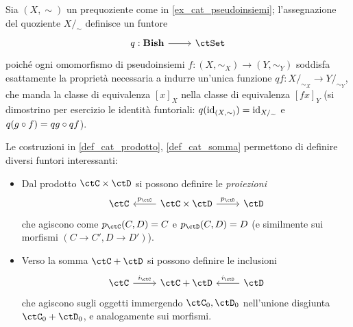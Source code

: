 \begin{example}
	Sia \((X,\sim)\) un prequoziente come in \ref{ex_cat_pseudoinsiemi}; l'assegnazione del quoziente \(X/_\sim\) definisce un funtore
	\[\dmFun q{\cate{Bish}}{\ctSet}\]
	poiché ogni omomorfismo di pseudoinsiemi \(f : (X,\sim_X)\to (Y,\sim_Y)\) soddisfa esattamente la proprietà necessaria a indurre un'unica funzione \(qf : X/_{\sim_X}\to Y/_{\sim_Y}\), che manda la classe di equivalenza \([x]_X\) nella classe di equivalenza \([fx]_Y\) (si dimostrino per esercizio le identità funtoriali: \(q(\mathrm{id}_{(X,\sim)})=\mathrm{id}_{X/_\sim}\) e \(q(g\circ f)=qg\circ qf\)).
\end{example}
\begin{example}
	Le costruzioni in \ref{def_cat_prodotto}, \ref{def_cat_somma} permettono di definire diversi funtori interessanti:
	\begin{itemize}
		\item Dal prodotto \(\ctC\times\ctD\) si possono definire le \emph{proiezioni}
		      \[\begin{tikzcd}
				      \ctC & {\ctC\times\ctD} & \ctD
				      \arrow["{p_\ctC}"', from=1-2, to=1-1]
				      \arrow["{p_\ctD}", from=1-2, to=1-3]
			      \end{tikzcd}\]
		      che agiscono come \(p_\ctC(C,D)=C\) e \(p_\ctD(C,D)=D\) (e similmente sui morfismi \((C\to C', D\to D')\)).
		\item Verso la somma \(\ctC+\ctD\) si possono definire le inclusioni
		      \[\begin{tikzcd}
				      \ctC & {\ctC+\ctD} & \ctD
				      \arrow["{i_\ctC}", from=1-1, to=1-2]
				      \arrow["{i_\ctD}"', from=1-3, to=1-2]
			      \end{tikzcd}\]
		      che agiscono sugli oggetti immergendo \(\ctC_0,\ctD_0\) nell'unione disgiunta \(\ctC_0+\ctD_0\), e analogamente sui morfismi.
	\end{itemize}
\end{example}
